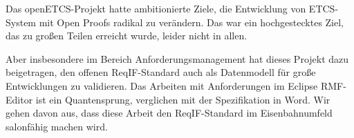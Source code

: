 \documentclass[twoside]{article}
\begin{document}
\begin{multicols}{2}
Das openETCS-Projekt hatte ambitionierte Ziele, die Entwicklung von ETCS-System mit \glqq{}Open Proofs\grqq{} radikal zu verändern. Das war ein hochgestecktes Ziel, das zu großen Teilen erreicht wurde, leider nicht in allen.

Aber insbesondere im Bereich Anforderungsmanagement hat dieses Projekt dazu beigetragen, den offenen ReqIF-Standard auch als Datenmodell für große Entwicklungen zu validieren.  Das Arbeiten mit Anforderungen im Eclipse RMF-Editor ist ein Quantensprung, verglichen mit der Spezifikation in Word. Wir gehen davon aus, dass diese Arbeit den ReqIF-Standard im Eisenbahnumfeld salonfähig machen wird.

\end{multicols}

\titleformat{\section}[block]{\large\scshape\centering{}}{}{1em}{}



\end{document}

